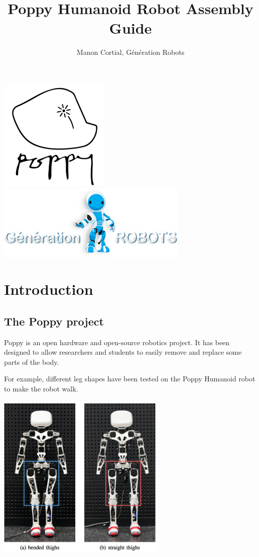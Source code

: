 \documentclass{article}
\begin{document}
\title{Poppy Humanoid Robot Assembly Guide}
\author{Manon Cortial, Génération Robots}

\maketitle

  \includegraphics[height=0.22\textwidth]{img/poppy-logo} \hfill \includegraphics[height=0.22\textwidth]{img/GR-logo}

  \tableofcontents

\section{Introduction}

\subsection{The Poppy project}

Poppy is an open hardware and open-source robotics project. It has been designed to allow researchers and students to easily remove and replace some parts of the body. 

For example, different leg shapes have been tested on the Poppy Humanoid robot to make the robot walk.

 \begin{center}
  \includegraphics[width=0.6\textwidth]{img/humanoids2013_Experiments}
 \end{center}
\end{document}
